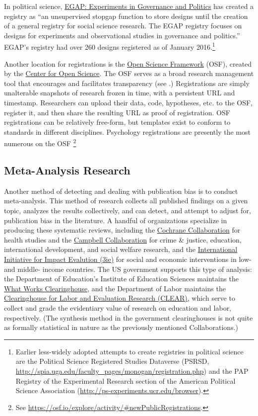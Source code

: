 \documentclass[12pt] {article}
\begin{document}
In political science, \href{http://e-gap.org/design-registration}{EGAP: Experiments in Governance and Politics} has
created a registry as ``an unsupervised stopgap function to store
designs until the creation of a general registry for social science
research. The EGAP registry focuses on designs for experiments and
observational studies in governance and politics.'' EGAP's registry had over 260
designs registered as of January 2016.\footnote{Earlier less-widely
  adopted attempts to create registries in political science are the
  Political Science Registered Studies Dataverse (PSRSD,
  \href{../customXml/item1.xml}{http://spia.uga.edu/faculty\_pages/monogan/registration.php})
  and the PAP Registry of the Experimental Research section of the
  American Political Science Association
  (\href{numbering.xml}{http://ps-experiments.ucr.edu/browser}).}

Another location for registrations is the \href{http://osf.io}{Open Science Framework} (OSF), created by the \href{http://centerforopenscience.org/}{Center for Open Science}. The OSF serves as a broad research management tool that encourages and facilitates transparency (see \cite{nosek_scientific_2012}.) Registrations are simply unalterable snapshots of research frozen in time, with a persistent URL and timestamp. Researchers can upload their data, code, hypotheses, etc. to the OSF, register it, and then share the resulting URL as proof of registration. OSF registrations can be relatively free-form, but templates exist to conform to standards in different disciplines. Psychology registrations are presently the most numerous on the OSF \footnote{See \url{https://osf.io/explore/activity/\#newPublicRegistrations}.}

\subsection{Meta-Analysis Research}
Another method of detecting and dealing with publication bias is to conduct meta-analysis. This method of research collects all published findings on a given topic, analyzes the results collectively, and can detect, and attempt to adjust for, publication bias in the literature. A handful of organizations specialize in producing these systematic reviews, including the \href{http://www.cochrane.org}{Cochrane Collaboration} for health studies and the \href{http://www.campbellcollaboration.org/}{Campbell Collaboration} for crime \& justice, education, international development, and social welfare research, and the \href{http://www.3ie.org}{International Initiative for Impact Evalution (3ie)} for social and economic interventions in low- and middle- income countries. The US government supports this type of analysis: the Department of Education's Institute of Education Sciences maintains the \href{http://ies.ed.gov/ncee/wwc/}{What Works Clearinghouse}, and the Department of Labor maintains the \href{http://clear.dol.gov/}{Clearinghouse for Labor and Evaluation Research (CLEAR)}, which serve to collect and grade the evidentiary value of research on education and labor, respectively. (The synthesis method in the government clearinghouses is not quite as formally statistical in nature as the previously mentioned Collaborations.)
\end{document}

